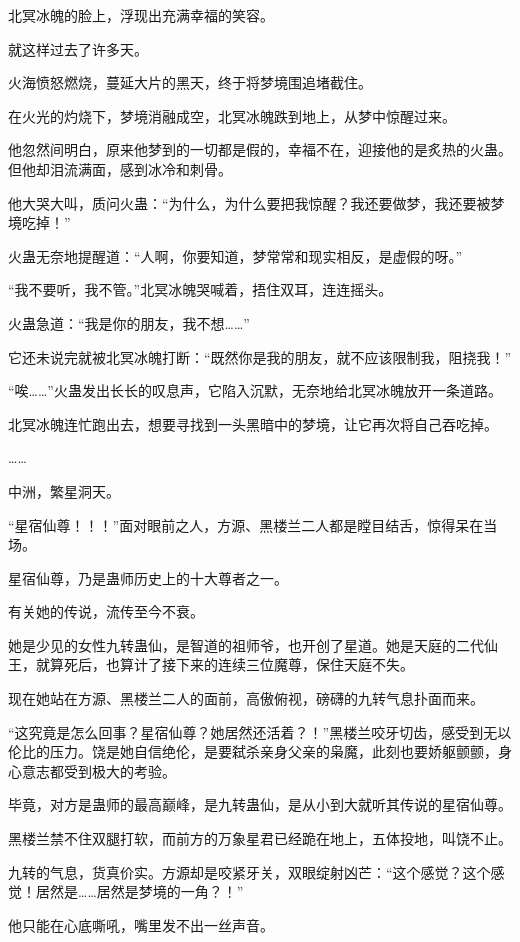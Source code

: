 \begin{this_body}
北冥冰魄的脸上，浮现出充满幸福的笑容。

就这样过去了许多天。

火海愤怒燃烧，蔓延大片的黑天，终于将梦境围追堵截住。

在火光的灼烧下，梦境消融成空，北冥冰魄跌到地上，从梦中惊醒过来。

他忽然间明白，原来他梦到的一切都是假的，幸福不在，迎接他的是炙热的火蛊。但他却泪流满面，感到冰冷和刺骨。

他大哭大叫，质问火蛊：“为什么，为什么要把我惊醒？我还要做梦，我还要被梦境吃掉！”

火蛊无奈地提醒道：“人啊，你要知道，梦常常和现实相反，是虚假的呀。”

“我不要听，我不管。”北冥冰魄哭喊着，捂住双耳，连连摇头。

火蛊急道：“我是你的朋友，我不想……”

它还未说完就被北冥冰魄打断：“既然你是我的朋友，就不应该限制我，阻挠我！”

“唉……”火蛊发出长长的叹息声，它陷入沉默，无奈地给北冥冰魄放开一条道路。

北冥冰魄连忙跑出去，想要寻找到一头黑暗中的梦境，让它再次将自己吞吃掉。

……

中洲，繁星洞天。

“星宿仙尊！！！”面对眼前之人，方源、黑楼兰二人都是瞠目结舌，惊得呆在当场。

星宿仙尊，乃是蛊师历史上的十大尊者之一。

有关她的传说，流传至今不衰。

她是少见的女性九转蛊仙，是智道的祖师爷，也开创了星道。她是天庭的二代仙王，就算死后，也算计了接下来的连续三位魔尊，保住天庭不失。

现在她站在方源、黑楼兰二人的面前，高傲俯视，磅礴的九转气息扑面而来。

“这究竟是怎么回事？星宿仙尊？她居然还活着？！”黑楼兰咬牙切齿，感受到无以伦比的压力。饶是她自信绝伦，是要弑杀亲身父亲的枭魔，此刻也要娇躯颤颤，身心意志都受到极大的考验。

毕竟，对方是蛊师的最高巅峰，是九转蛊仙，是从小到大就听其传说的星宿仙尊。

黑楼兰禁不住双腿打软，而前方的万象星君已经跪在地上，五体投地，叫饶不止。

九转的气息，货真价实。方源却是咬紧牙关，双眼绽射凶芒：“这个感觉？这个感觉！居然是……居然是梦境的一角？！”

他只能在心底嘶吼，嘴里发不出一丝声音。


\end{this_body}
